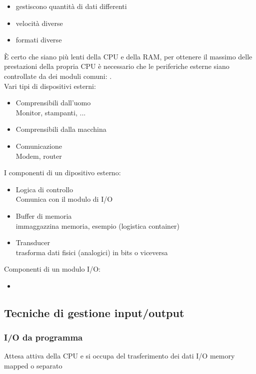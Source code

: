 \documentclass[12pt, a4paper]{report}
\begin{document}
\begin{itemize}
	\item gestiscono quantità di dati differenti
	\item velocità diverse
	\item formati diverse
\end{itemize}
È certo che siano più lenti della CPU e della RAM, per ottenere il massimo delle
prestazioni della propria CPU è necessario che le periferiche esterne siano 
controllate da dei moduli comuni: .\\

Vari tipi di dispositivi esterni:
\begin{itemize}
	\item Comprensibili dall'uomo\\
		Monitor, stampanti, ...
	\item Comprensibili dalla macchina
	\item Comunicazione\\
		Modem, router
\end{itemize}

I componenti di un dipositivo esterno:

\begin{itemize}
	\item Logica di controllo\\
		Comunica con il modulo di I/O
	\item Buffer di memoria\\
		immaggazzina memoria, esempio (logistica container)
	\item Transducer\\
		trasforma dati fisici (analogici) in bits o viceversa
\end{itemize}

Componenti di un modulo I/O:

\begin{itemize}
	\item 					
\end{itemize}

\subsection{Tecniche di gestione input/output}%
\label{sub:tecniche_di_gestione_input_output}

\subsubsection{I/O da programma}
Attesa attiva della CPU e si occupa del trasferimento dei dati 
I/O memory mapped o separato
\end{document}
